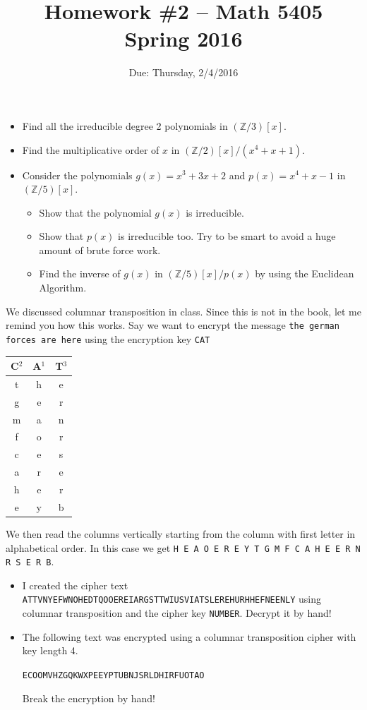 \documentclass[11pt]{amsart}
\newcommand{\bZ}{\mathbb{Z}}
\begin{document}
\title{Homework \#2 -- Math 5405\\Spring 2016}
\author{Due: Thursday, 2/4/2016}
\maketitle
\begin{itemize}
\item[1.] Find all the irreducible degree 2 polynomials in $(\bZ/3)[x]$.  
\item[2.] Find the multiplicative order of $x$ in $(\bZ/2)[x]/(x^4 + x + 1)$.  
\item[3.] Consider the polynomials $g(x) = x^3 + 3x + 2$ and $p(x) = x^4  + x - 1$ in $(\bZ/5)[x]$.  
\begin{itemize}
\item[(a)]  Show that the polynomial $g(x)$ is irreducible.  
\item[(b*)]  Show that  $p(x)$ is irreducible too.  Try to be smart to avoid a huge amount of brute force work.
\item[(c)]  Find the inverse of $g(x)$ in $(\bZ/5)[x]/p(x)$ by using the Euclidean Algorithm.
\end{itemize}
\end{itemize}
\vskip 12pt
We discussed columnar transposition in class.  Since this is not in the book, let me remind you how this works.  Say we want to encrypt the message {\tt the german forces are here} using the encryption key {\tt CAT}
\begin{center}
\begin{tabular}{||c|c|c||}
\hline
\hline
C${}^2$ & A${}^1$ & T${}^3$\\
\hline
t & h & e\\
g & e & r\\
m & a & n\\
f & o & r\\
c & e & s\\
a & r & e\\
h & e & r\\
e & y & b\\
\hline
\hline
\end{tabular}
\end{center}
We then read the columns vertically starting from the column with first letter in alphabetical
order. In this case we get {\tt H E A O E R E Y T G M F C A H E E R N R S E R B}.
\begin{itemize}
\item[4.] I created the cipher text {\tt ATTVNYEFWNOHEDTQOOEREIARGSTTWIUSVIATSLEREHURHHEFNEENLY} using columnar transposition and the cipher key {\tt NUMBER}.  Decrypt it by hand!
\item[5.] The following text was encrypted using a columnar transposition cipher with key length 4.  \begin{center}{\tt ECOOMVHZGQKWXPEEYPTUBNJSRLDHIRFUOTAO}\end{center}  Break the encryption by hand!
\end{itemize}
\end{document}
